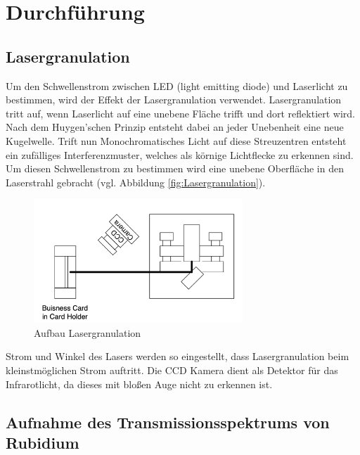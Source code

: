 \section{Durchführung}
\label{sec:Durchführung}
\subsection{Lasergranulation}
Um den Schwellenstrom zwischen LED (light emitting diode) und Laserlicht zu bestimmen,
wird der Effekt der Lasergranulation verwendet.
Lasergranulation tritt auf, wenn Laserlicht auf eine unebene Fläche trifft 
und dort reflektiert wird.
Nach dem Huygen'schen Prinzip entsteht dabei an jeder Unebenheit eine neue Kugelwelle.
Trift nun Monochromatisches Licht auf diese Streuzentren entsteht ein zufälliges Interferenzmuster,
welches als körnige Lichtflecke zu erkennen sind.
Um diesen Schwellenstrom zu bestimmen wird eine unebene Oberfläche in den Laserstrahl gebracht (vgl. Abbildung \eqref{fig:Lasergranulation}).
\begin{figure}[h]
    \centering
    \includegraphics[width=0.7\textwidth]{abb/aufbau1.png}
    \caption{Aufbau Lasergranulation \cite{aufbau}}
    \label{fig:Lasergranulation}
\end{figure}
Strom und Winkel des Lasers werden so eingestellt,
dass Lasergranulation beim kleinstmöglichen Strom auftritt.
Die CCD Kamera dient als Detektor für das Infrarotlicht,
da dieses mit bloßen Auge nicht zu erkennen ist.

\subsection{Aufnahme des Transmissionsspektrums von Rubidium}

